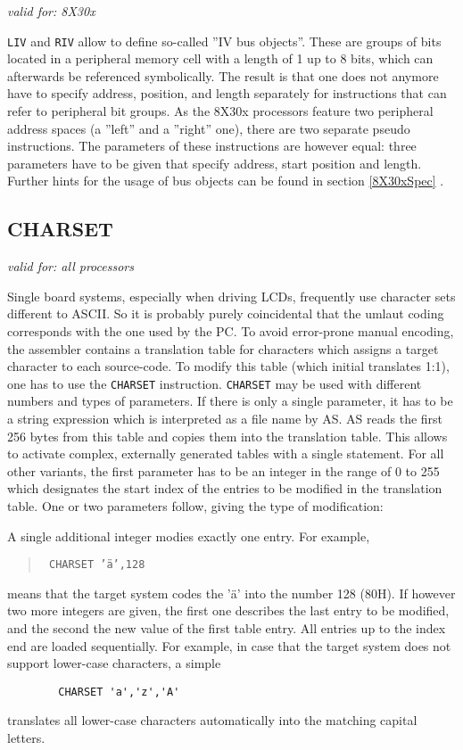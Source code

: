 \documentclass[12pt,twoside]{report}
\makeatletter
\newcommand{\tty}[1]{{\tt #1}}
\newcommand{\ttindex}[1]{\index{#1@{\tt #1}}}
\makeatother
\begin{document}
{\em valid for: 8X30x}

\tty{LIV} and \tty{RIV} allow to define so-called ''IV bus objects''.
These are
groups of bits located in a peripheral memory cell with a length of 1
up to 8 bits, which can afterwards be referenced symbolically.  The
result is that one does not anymore have to specify address,
position, and length separately for instructions that can refer to
peripheral bit groups.  As the 8X30x processors feature two
peripheral address spaces (a ''left'' and a ''right'' one), there are two
separate pseudo instructions.  The parameters of these instructions
are however equal: three parameters have to be given that specify
address, start position and length.  Further hints for the usage of
bus objects can be found in section \ref{8X30xSpec} .


\subsection{CHARSET}
\ttindex{CHARSET}

{\em valid for: all processors}

Single board systems, especially when driving LCDs, frequently use
character sets different to ASCII.  So it is probably purely coincidental
that the umlaut coding corresponds with the one used by the PC.  To avoid
error-prone manual encoding, the assembler contains a translation table
for characters which assigns a target character to each source-code.  To
modify this table (which initial translates 1:1), one has to use the
\tty{CHARSET} instruction.  \tty{CHARSET} may be used with different
numbers and types of parameters.  If there is only a single parameter, it
has to be a string expression which is interpreted as a file name by AS.
AS reads the first 256 bytes from this table and copies them into the
translation table.  This allows to activate complex, externally generated
tables with a single statement.  For all other variants, the first
parameter has to be an integer in the range of 0 to 255 which designates
the start index of the entries to be modified in the translation table.
One or two parameters follow, giving the type of modification:

A single additional integer modies exactly one entry.  For example,
\begin{quote}{\tt
       CHARSET  '\"a',128
}\end{quote}
means that the target system codes the '\"a'  into the number 128
(80H).  If however two more integers are given, the first one describes
the last entry to be modified, and the second the new value of the first
table entry.  All entries up to the index end are loaded sequentially.
For example, in case that the target system does not support lower-case
characters, a simple
\begin{verbatim}
        CHARSET 'a','z','A'
\end{verbatim}
translates all lower-case characters  automatically into the
matching capital letters.
\end{document}
